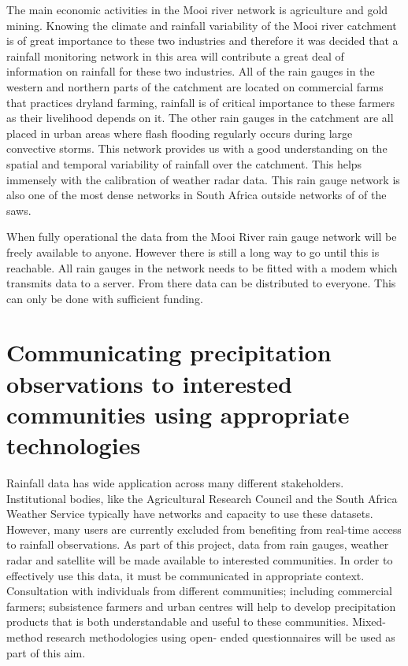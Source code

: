 \documentclass{wrcreport}
\begin{document}
The main economic activities in the Mooi river network is agriculture
and gold mining. Knowing the climate and rainfall variability of the
Mooi river catchment is of great importance to these two industries
and therefore it was decided that a rainfall monitoring network in
this area will contribute a great deal of information on rainfall for
these two industries. All of the rain gauges in the western and
northern parts of the catchment are located on commercial farms that
practices dryland farming, rainfall is of critical importance to these
farmers as their livelihood depends on it. The other rain gauges in
the catchment are all placed in urban areas where flash flooding
regularly occurs during large convective storms.  This network
provides us with a good understanding on the spatial and temporal
variability of rainfall over the catchment. This helps immensely with
the calibration of weather radar data. This rain gauge network is also
one of the most dense networks in South Africa outside networks of of
the \gls{saws}.

When fully operational the data from the Mooi River rain gauge network
will be freely available to anyone. However there is still a long way
to go until this is reachable. All rain gauges in the network needs to
be fitted with a modem which transmits data to a server. From there
data can be distributed to everyone. This can only be done with
sufficient funding.

\section{Communicating precipitation observations to interested communities using appropriate technologies}

Rainfall data has wide application across many different stakeholders.
Institutional bodies, like the Agricultural Research Council and the
South Africa Weather Service typically have networks and capacity to
use these datasets. However, many users are currently excluded from
benefiting from real-time access to rainfall observations. As part of
this project, data from rain gauges, weather radar and satellite will
be made available to interested communities. In order to effectively
use this data, it must be communicated in appropriate context.
Consultation with individuals from different communities; including
commercial farmers; subsistence farmers and urban centres will help to
develop precipitation products that is both understandable and useful
to these communities. Mixed-method research methodologies using open-
ended questionnaires will be used as part of this aim.
\end{document}
